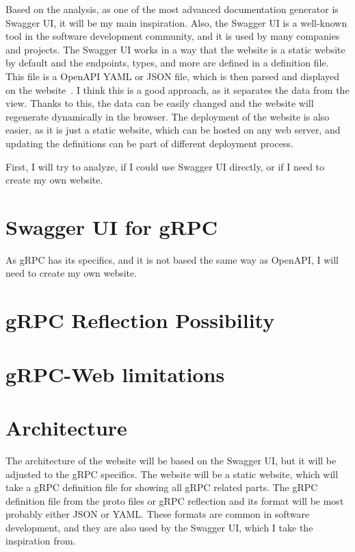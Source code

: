 Based on the analysis, as one of the most advanced documentation generator is Swagger UI, it will be my main inspiration.
Also, the Swagger UI is a well-known tool in the software development community, and it is used by many companies and projects.
The Swagger UI works in a way that the website is a static website by default and the endpoints, types, and more are defined in a definition file.
This file is a OpenAPI YAML or JSON file, which is then parsed and displayed on the website~\cite{swagger-ui-definition-file}.
I think this is a good approach, as it separates the data from the view.
Thanks to this, the data can be easily changed and the website will regenerate dynamically in the browser.
The deployment of the website is also easier, as it is just a static website, which can be hosted on any web server, and updating the definitions can be part of different deployment process.

First, I will try to analyze, if I could use Swagger UI directly, or if I need to create my own website.


\section{Swagger UI for gRPC}


As gRPC has its specifics, and it is not based the same way as OpenAPI, I will need to create my own website.


\section{gRPC Reflection Possibility}


\section{gRPC-Web limitations}


\section{Architecture}
The architecture of the website will be based on the Swagger UI, but it will be adjusted to the gRPC specifics.
The website will be a static website, which will take a gRPC definition file for showing all gRPC related parts.
The gRPC definition file from the proto files or gRPC reflection and its format will be most probably either JSON or YAML\@.
These formats are common in software development, and they are also used by the Swagger UI, which I take the inspiration from.

